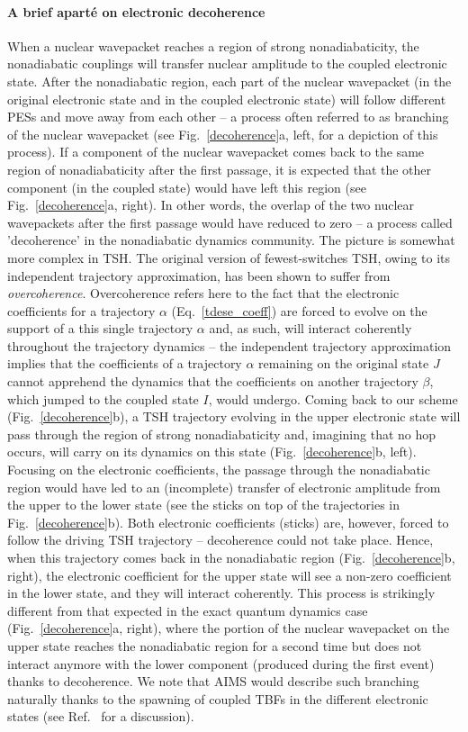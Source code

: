 \documentclass[9pt,bestpractices]{livecoms}
\begin{document}
\paragraph{A brief apart\'{e} on electronic decoherence}
When a nuclear wavepacket reaches a region of strong nonadiabaticity, the nonadiabatic couplings will transfer nuclear amplitude to the coupled electronic state. After the nonadiabatic region, each part of the nuclear wavepacket (in the original electronic state and in the coupled electronic state) will follow different PESs and move away from each other -- a process often referred to as branching of the nuclear wavepacket (see Fig.~\ref{decoherence}a, left, for a depiction of this process). If a component of the nuclear wavepacket comes back to the same region of nonadiabaticity after the first passage, it is expected that the other component (in the coupled state) would have left this region (see Fig.~\ref{decoherence}a, right). In other words, the overlap of the two nuclear wavepackets after the first passage would have reduced to zero -- a process called 'decoherence' in the nonadiabatic dynamics community. The picture is somewhat more complex in TSH. The original version of fewest-switches TSH, owing to its independent trajectory approximation, has been shown to suffer from \textit{overcoherence}. Overcoherence refers here to the fact that the electronic coefficients for a trajectory $\alpha$ (Eq.~\eqref{tdese_coeff}) are forced to evolve on the support of a this single trajectory $\alpha$ and, as such, will interact coherently throughout the trajectory dynamics -- the independent trajectory approximation implies that the coefficients of a trajectory $\alpha$ remaining on the original state $J$ cannot apprehend the dynamics that the coefficients on another trajectory $\beta$, which jumped to the coupled state $I$, would undergo. Coming back to our scheme (Fig.~\ref{decoherence}b), a TSH trajectory evolving in the upper electronic state will pass through the region of strong nonadiabaticity and, imagining that no hop occurs, will carry on its dynamics on this state (Fig.~\ref{decoherence}b, left). Focusing on the electronic coefficients, the passage through the nonadiabatic region would have led to an (incomplete) transfer of electronic amplitude from the upper to the lower state (see the sticks on top of the trajectories in Fig.~\ref{decoherence}b). Both electronic coefficients (sticks) are, however, forced to follow the driving TSH trajectory -- decoherence could not take place. Hence, when this trajectory comes back in the nonadiabatic region (Fig.~\ref{decoherence}b, right), the electronic coefficient for the upper state will see a non-zero coefficient in the lower state, and they will interact coherently. This process is strikingly different from that expected in the exact quantum dynamics case (Fig.~\ref{decoherence}a, right), where the portion of the nuclear wavepacket on the upper state reaches the nonadiabatic region for a second time but does not interact anymore with the lower component (produced during the first event) thanks to decoherence. We note that AIMS would describe such branching naturally thanks to the spawning of coupled TBFs in the different electronic states (see Ref.~ for a discussion).
\end{document}
